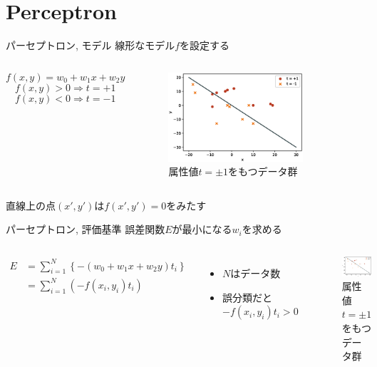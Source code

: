 \documentclass[dvipdfmx,platex]{beamer}
\begin{document}
\section{Perceptron}
\begin{frame}{{\mgfamily パーセプトロン, モデル}}
  線形なモデル$f$を設定する
  \begin{columns}[T,onlytextwidth]
    \[f(x,y)=w_0+w_1x+w_2y\]
    \[f(x,y)>0\Rightarrow t = +1\]
    \[f(x,y)<0\Rightarrow t = -1\]
    \begin{figure}
      \centering
      \includegraphics[width=5cm]{fig/scatter.eps}
      \caption{{\mgfamily 属性値$t=\pm1$をもつデータ群}}
    \end{figure}
  \end{columns}
  直線上の点$(x',y')$は$f(x',y')=0$をみたす
\end{frame}
\begin{frame}{{\mgfamily パーセプトロン, 評価基準}}
  誤差関数$E$が最小になる$w_i$を求める
  \begin{columns}[T,onlytextwidth]
    \begin{align*}
      E
      &=\sum_{i=1}^{N}{\left\{-\left(w_0+w_1x+w_2y\right)t_i\right\}}\\
      &=\sum_{i=1}^{N}{\left(-f(x_i,y_i)t_i\right)}
    \end{align*}
    \begin{itemize}
    \item $N$はデータ数
    \item 誤分類だと$-f(x_i,y_i)t_i>0$
    \end{itemize}
    \begin{figure}
      \centering
      \includegraphics[width=5cm]{fig/scatter.eps}
      \caption{{\mgfamily 属性値$t=\pm1$をもつデータ群}}
    \end{figure}
  \end{columns}
\end{frame}
\end{document}
